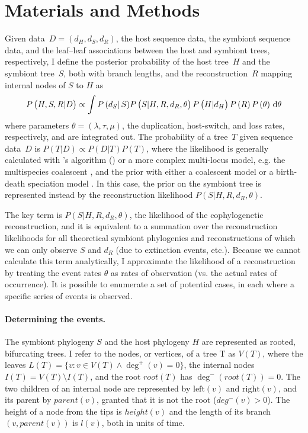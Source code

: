 \documentclass[12pt,letterpaper]{article}
\newcommand{\aposcite}[2]{\citeauthor{#1}'s #2 (\citeyear{#1})}
\begin{document}
\section*{Materials and Methods}

Given data~$D = \left(d_H,d_S,d_R\right)$, the host sequence data, the symbiont sequence data, and the leaf--leaf associations between the host and symbiont trees, respectively, I define the posterior probability of the host tree~$H$ and the symbiont tree~$S$, both with branch lengths, and the reconstruction~$R$ mapping internal nodes of $S$ to $H$ as
\begin{equation}
P\left(H,S,R|D\right) \propto \int P\left(d_S\right|S) P\left(S|H,R,d_R,\theta\right) P\left(H|d_H\right) P\left(R\right) P\left(\theta\right) \, \dif \theta
\label{eq:cophylogenyposterior}
\end{equation}
where parameters $\theta = \left(\lambda,\tau,\mu\right)$, the duplication, host-switch, and loss rates, respectively, and are integrated out. The probability of a tree~$T$ given sequence data~$D$ is $P\left(T|D\right) \propto P\left(D|T\right) P\left(T\right)$, where the likelihood is generally calculated with \aposcite{Felsenstein:1981}{algorithm} or a more complex multi-locus model, e.g. the multispecies coalescent \parencite{Heled:2010a}, and the prior with either a coalescent model \parencite{Kingman:1982} or a birth-death speciation model \parencite{Gernhard:2008}. In this case, the prior on the symbiont tree is represented instead by the reconstruction likelihood $P\left(S|H,R,d_R,\theta\right)$.

The key term is $P\left(S|H,R,d_R,\theta\right)$, the likelihood of the cophylogenetic reconstruction, and it is equivalent to a summation over the reconstruction likelihoods for all theoretical symbiont phylogenies and reconstructions of which we can only observe $S$ and $d_R$ (due to extinction events, etc.). Because we cannot calculate this term analytically, I approximate the likelihood of a reconstruction by treating the event rates $\theta$ as rates of observation (vs. the actual rates of occurrence). It is possible to enumerate a set of potential cases, in each where a specific series of events is observed.

\paragraph*{Determining the events.}

The symbiont phylogeny $S$ and the host phylogeny $H$ are represented as rooted, bifurcating trees. I refer to the nodes, or vertices, of a tree T as $V(T)$, where the leaves $L(T) = \{v : v \in V(T) \wedge \deg^+(v)=0\}$, the internal nodes $I(T) = V(T) \setminus I(T)$, and the root $root(T)$ has $\deg^-(root(T)) = 0$. The two children of an internal node are represented by $\text{left}(v)$ and $\text{right}(v)$, and its parent by $parent(v)$, granted that it is not the root ($deg^-(v)>0$). The height of a node from the tips is $height(v)$ and the length of its branch $(v, parent(v))$ is $l(v)$, both in units of time.
\end{document}
